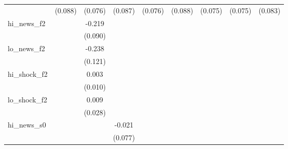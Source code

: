 {\begin{tabular}{l*{8}{c}}
            &     (0.088)         &     (0.076)         &     (0.087)         &     (0.076)         &     (0.088)         &     (0.075)         &     (0.075)         &     (0.083)         \\
\addlinespace
hi\_news\_f2  &                     &      -0.219\sym{**} &                     &                     &                     &                     &                     &                     \\
            &                     &     (0.090)         &                     &                     &                     &                     &                     &                     \\
\addlinespace
lo\_news\_f2  &                     &      -0.238\sym{*}  &                     &                     &                     &                     &                     &                     \\
            &                     &     (0.121)         &                     &                     &                     &                     &                     &                     \\
\addlinespace
hi\_shock\_f2 &                     &       0.003         &                     &                     &                     &                     &                     &                     \\
            &                     &     (0.010)         &                     &                     &                     &                     &                     &                     \\
\addlinespace
lo\_shock\_f2 &                     &       0.009         &                     &                     &                     &                     &                     &                     \\
            &                     &     (0.028)         &                     &                     &                     &                     &                     &                     \\
\addlinespace
hi\_news\_s0  &                     &                     &      -0.021         &                     &                     &                     &                     &                     \\
            &                     &                     &     (0.077)         &                     &                     &                     &                     &                     \\

\end{tabular}}

